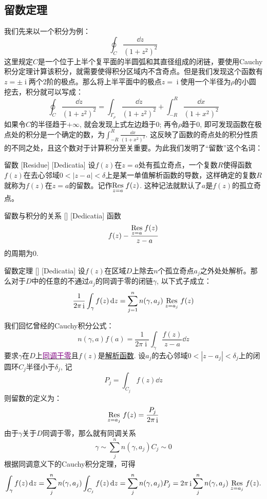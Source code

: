 \documentclass[UTF8]{ctexart}
\newcommand{\hyperrefc}[2]{\hyperref[#1]{\textcolor{purple}{#2}}}
\DeclareMathOperator{\ii}{\mathrm{i}}
\newcommand{\AnalyticalFunction}{\hyperref[dfn:AnalyticalFunction]{解析函数}}
\begin{document}
\subsection{留数定理}
我们先来以一个积分为例：
\[\oint_C \frac{\dd{z}}{(1+z^2)^2}\]
这里规定$C$是一个位于上半个复平面的半圆弧和其直径组成的闭链，要使用Cauchy积分定理计算该积分，就需要使得积分区域内不含奇点。但是我们发现这个函数有$z=\pm\ii$两个2阶的极点。那么将上半平面中的极点$z=\ii$使用一个半径为$\rho$的小圆挖去，积分就可以写成：
\[\oint_{C} \frac{\dd{z}}{(1+z^2)^2}=\int_{\Gamma_\rho}\frac{\dd{z}}{(1+z^2)^2}+\int_{-R}^R\frac{\dd{x}}{(1+x^2)^2}\]
如果令$C$的半径趋于$+\infty$, 就会发现上式左边趋于0; 再令$\rho$趋于0, 即可发现函数在极点处的积分是一个确定的数，为$\int_{-R}^R\frac{\dd{x}}{(1+x^2)^2}$. 这反映了函数的奇点处的积分性质的不同之处，且这个数对于计算积分至关重要。为此我们发明了“留数”这个名词：
\begin{dfn}
    [UUID]
    {留数}
    [Residue]
    [Dedicatia]
    设$f(z)$在$z=a$处有孤立奇点，一个复数$R$使得函数$f(z)$在去心邻域$0<|z-a|<\delta$上是某一单值解析函数的导数，这样确定的复数$R$就称为$f(z)$在$z=a$的留数。记作$\underset{z=a}{\Res} f(z)$. 这种记法就默认了$a$是$f(z)$的孤立奇点。
\end{dfn}
\begin{ppt}
    [UUID]
    {留数与积分的关系}
    []
    [Dedicatia]
    函数
    \[f(z)-\frac{\underset{z=a}{\Res}f(z)}{z-a}\]
    的周期为0.
\end{ppt}
\begin{thm}
    [UUID]
    {留数定理}
    []
    [Dedicatia]
    设$f(z)$在区域$D$上除去$n$个孤立奇点$a_j$之外处处解析。那么对于$D$中的任意的不通过$a_j$的同调于零的闭链$\gamma$, 以下式子成立：
    \[\frac{1}{2\pi\ii}\int_\gamma f(z)\dd{z}=\sum_{j=1}^{n}n(\gamma,a_j)\underset{z=a_j}{\Res}f(z)\]
\end{thm}
\begin{prf}
    我们回忆曾经的Cauchy积分公式：
    \[n(\gamma,a)f(a)=\frac{1}{2\pi\ii}\int_\gamma\frac{f(z)}{z-a}\dd{z}\]
    要求$\gamma$在$D$上\hyperrefc{dfn:NullHomologous}{同调于零}且$f(z)$是\AnalyticalFunction . 设$a_j$的去心邻域$0<|z-a_j|<\delta_j$上的闭圆环$C_j$半径小于$\delta_j$, 记
    \[P_j = \int_{C_j} f(z)\dd{z}\]
    则留数的定义为：
    \[\underset{z=a_j}{\Res}f(z)=\frac{P_j}{2\pi\ii}\]
    由于$\gamma$关于$D$同调于零，那么就有同调关系
    \[\gamma\sim\sum_j^nn(\gamma,a_j)C_j\sim 0\]
    根据同调意义下的Cauchy积分定理，可得
    \[\int_\gamma f(z)\dd{z}=\sum_j^nn(\gamma,a_j)\int_{C_j} f(z)\dd{z}=\sum_j^nn(\gamma,a_j)P_j=2\pi\ii\sum_j^nn(\gamma,a_j)\underset{z=a_j}{\Res}f(z).\]
\end{prf}
\end{document}
